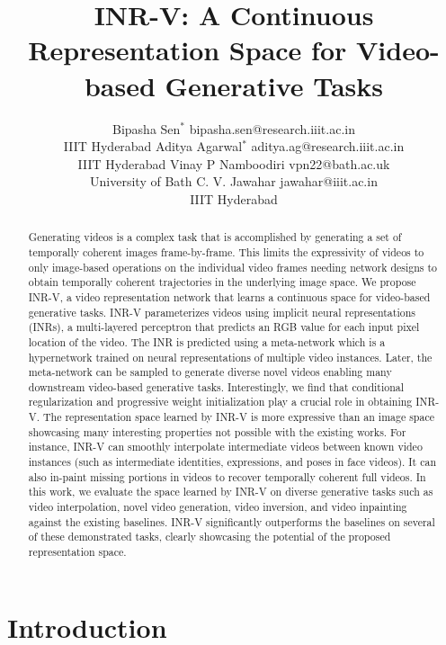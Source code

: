 \documentclass[10pt]{article} \usepackage[accepted]{tmlr}
\title {INR-V: A Continuous Representation Space for Video-based Generative Tasks}
\author{\name Bipasha Sen$^*$ \email bipasha.sen@research.iiit.ac.in \\
      \addr IIIT Hyderabad
      \AND
      \name Aditya Agarwal$^*$ \email aditya.ag@research.iiit.ac.in \\
      \addr IIIT Hyderabad
      \AND
      \name Vinay P Namboodiri \email vpn22@bath.ac.uk \\
      \addr University of Bath
      \AND
      \name C. V. Jawahar \email
      jawahar@iiit.ac.in\\
      \addr IIIT Hyderabad}
\begin{document}
\maketitle

\def\thefootnote{*}

\begin{abstract}
Generating videos is a complex task that is accomplished by generating a set of temporally coherent images frame-by-frame. This limits the expressivity of videos to only image-based operations on the individual video frames needing network designs to obtain temporally coherent trajectories in the underlying image space. We propose INR-V, a video representation network that learns a continuous space for video-based generative tasks. INR-V parameterizes videos using implicit neural representations (INRs), a multi-layered perceptron that predicts an RGB value for each input pixel location of the video. The INR is predicted using a meta-network which is a hypernetwork trained on neural representations of multiple video instances. Later, the meta-network can be sampled to generate diverse novel videos enabling many downstream video-based generative tasks. Interestingly, we find that conditional regularization and progressive weight initialization play a crucial role in obtaining INR-V. The representation space learned by INR-V is more expressive than an image space showcasing many interesting properties not possible with the existing works. For instance, INR-V can smoothly interpolate intermediate videos between known video instances (such as intermediate identities, expressions, and poses in face videos). It can also in-paint missing portions in videos to recover temporally coherent full videos. In this work, we evaluate the space learned by INR-V on diverse generative tasks such as video interpolation, novel video generation, video inversion, and video inpainting against the existing baselines. INR-V significantly outperforms the baselines on several of these demonstrated tasks, clearly showcasing the potential of the proposed representation space.
\end{abstract}

\section{Introduction}
\label{sec:introduction}
\end{document}

